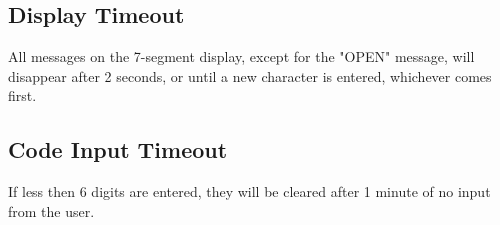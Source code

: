 \documentclass[11pt]{article}
\begin{document}
\subsection{Display Timeout}

All messages on the 7-segment display, except for the "OPEN" message, will disappear after 2 seconds, or until a new character is entered, whichever comes first.

\subsection{Code Input Timeout}

If less then 6 digits are entered, they will be cleared after 1 minute of no input from the user.
\end{document}
